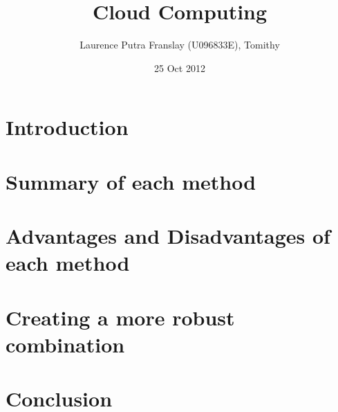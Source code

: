 \documentclass[]{article}
\begin{document}
\title{Cloud Computing}
\author{Laurence Putra Franslay (U096833E), Tomithy}
\date{25 Oct 2012}
\maketitle

\section{Introduction}

\section{Summary of each method}
\subsection{}

\subsection{}

\subsection{}

\subsection{}

\subsection{}

\section{Advantages and Disadvantages of each method}
\subsection{}

\subsection{}

\subsection{}

\subsection{}

\subsection{}

\section{Creating a more robust combination}

\section{Conclusion}
\end{document}
